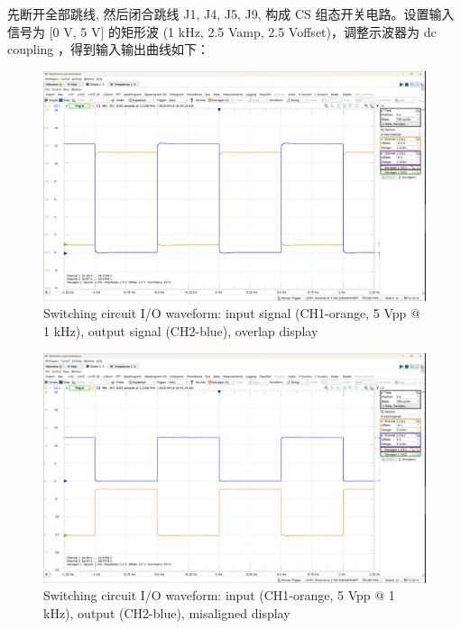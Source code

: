 \documentclass[UTF8]{article}
\begin{document}
先断开全部跳线, 然后闭合跳线 J1, J4, J5, J9, 构成 CS 组态开关电路。设置输入信号为 [0 V, 5 V] 的矩形波 (1 kHz, 2.5 Vamp, 2.5 Voffset)，调整示波器为 dc coupling ，得到输入输出曲线如下：
\begin{figure}[H]\centering
    \includegraphics[width=\columnwidth]{LCE-04-场效应管/assets/switching circuit/开关 input-output 1kHz.png}
    \caption{Switching circuit I/O waveform: input signal (CH1-orange, 5 Vpp @ 1 kHz), output signal (CH2-blue), overlap display}
\end{figure}
\begin{figure}[H]\centering
    \includegraphics[width=\columnwidth]{LCE-04-场效应管/assets/switching circuit/开关 input-output (2) 1kHz.png}
    \caption{Switching circuit I/O waveform: input (CH1-orange, 5 Vpp @ 1 kHz), output (CH2-blue), misaligned display}
\end{figure}
\end{document}
